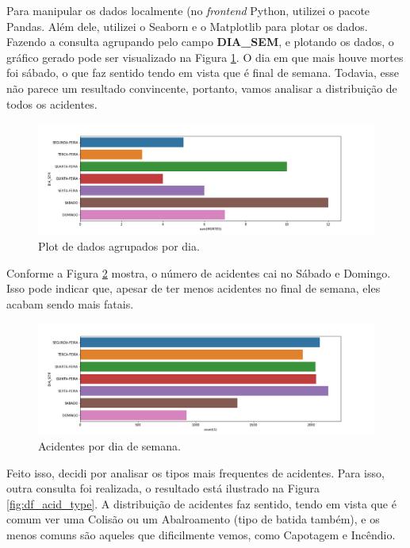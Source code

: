 \documentclass{article}
\begin{document}
Para manipular os dados localmente (no \emph{frontend} Python, utilizei o pacote Pandas. Além dele, utilizei o Seaborn e o Matplotlib para plotar os dados. Fazendo a consulta agrupando pelo campo \textbf{DIA\_SEM}, e plotando os dados, o gráfico gerado pode ser visualizado na Figura \ref{fig:df_dead_by_week}. O dia em que mais houve mortes foi sábado, o que faz sentido tendo em vista que é final de semana. Todavia, esse não parece um resultado convincente, portanto, vamos analisar a distribuição de todos os acidentes.

\begin{figure}[h]
  \includegraphics[width=\linewidth]{img/dead_by_week.png}
  \caption{Plot de dados agrupados por dia.}
  \label{fig:df_dead_by_week}
\end{figure}


Conforme a Figura \ref{fig:acid_by_weekday} mostra, o número de acidentes cai no Sábado e Domingo. Isso pode indicar que, apesar de ter menos acidentes no final de semana, eles acabam sendo mais fatais.

\begin{figure}[h]
  \includegraphics[width=\linewidth]{img/acid_by_weekday.png}
  \caption{Acidentes por dia de semana.}
  \label{fig:acid_by_weekday}
\end{figure}

Feito isso, decidi por analisar os tipos mais frequentes de acidentes. Para isso, outra consulta foi realizada, o resultado está ilustrado na Figura \ref{fig:df_acid_type}. A distribuição de acidentes faz sentido, tendo em vista que é comum ver uma Colisão ou um Abalroamento (tipo de batida também), e os menos comuns são aqueles que dificilmente vemos, como Capotagem e Incêndio.
\end{document}
